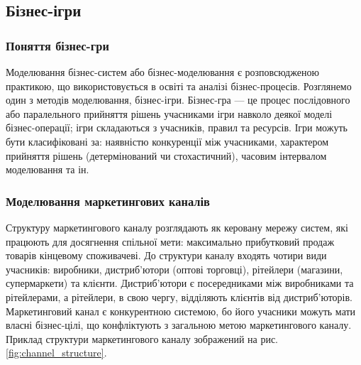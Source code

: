     \subsection{Бізнес-ігри}
        \subsubsection{Поняття бізнес-гри}
Моделювання бізнес-систем або бізнес-моделювання є розповсюдженою практикою, що використовується в освіті та аналізі бізнес-процесів. Розглянемо один з методів моделювання, бізнес-ігри. Бізнес-гра --- це процес послідовного або паралельного прийняття рішень учасниками ігри навколо деякої моделі бізнес-операції; ігри складаються з учасників, правил та ресурсів\cite{bg1, bg2}. Ігри можуть бути класифіковані за\cite{bg3}: наявністю конкуренції між учасниками, характером прийняття рішень (детермінований чи стохастичний), часовим інтервалом моделювання та ін.
        
        \subsubsection{Моделювання маркетингових каналів}
Структуру маркетингового каналу розглядають як керовану мережу систем, які працюють для досягнення спільної мети\cite{stern}: 
максимально прибутковий продаж товарів кінцевому споживачеві. До структури каналу входять чотири види учасників: виробники, дистриб’ютори (оптові торговці), рітейлери (магазини, супермаркети) та клієнти. Дистриб’ютори є посередниками між виробниками та рітейлерами, а рітейлери, в свою чергу, відділяють клієнтів від дистриб’юторів. Маркетинговий канал є конкурентною системою, бо його учасники можуть мати власні бізнес-цілі, що конфліктують з загальною метою маркетингового каналу. Приклад структури маркетингового каналу зображений на рис. \ref{fig:channel_structure}.

